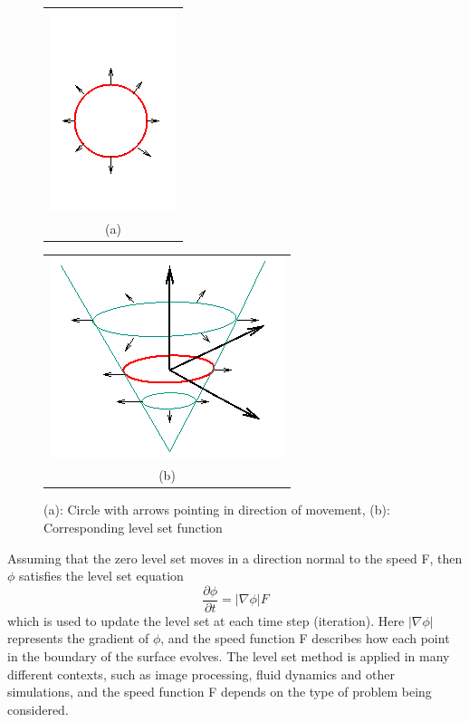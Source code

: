\begin{figure}[h!]
\centering
\begin{minipage}{.4\textwidth}
\begin{tabular}{c}
\includegraphics[height=.3\textheight]{levelset/f1a} \\
(a)
\end{tabular}
\end{minipage}
\begin{minipage}{.4\textwidth}
\begin{tabular}{c}
\includegraphics[height=.3\textheight]{levelset/f1b} \\
(b)
\end{tabular}
\end{minipage}
\caption{(a): Circle with arrows pointing in direction of movement, (b): Corresponding level set function}
\label{levelsetEx}
\end{figure}

Assuming that the zero level set moves in a direction normal to the speed F, then \(\phi\) satisfies the level set equation
\begin{equation}
\frac{\partial \phi}{\partial t} = |\nabla \phi|F
\label{levelSetEq}
\end{equation}
which is used to update the level set at each time step (iteration). Here \(|\nabla \phi|\) represents the gradient of \(\phi\), and the speed function F describes how each point in the boundary of the surface evolves. The level set method is applied in many different contexts, such as image processing, fluid dynamics and other simulations, and the speed function F depends on the type of problem being considered. 

